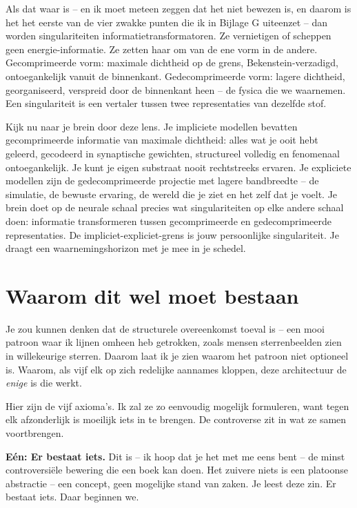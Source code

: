 \documentclass[11pt, twoside, openright]{book}
\begin{document}
Als dat waar is -- en ik moet meteen zeggen dat het niet bewezen is, en daarom is het het eerste van de vier zwakke punten die ik in Bijlage G uiteenzet -- dan worden singulariteiten informatietransformatoren. Ze vernietigen of scheppen geen energie-informatie. Ze zetten haar om van de ene vorm in de andere. Gecomprimeerde vorm: maximale dichtheid op de grens, Bekenstein-verzadigd, ontoegankelijk vanuit de binnenkant. Gedecomprimeerde vorm: lagere dichtheid, georganiseerd, verspreid door de binnenkant heen -- de fysica die we waarnemen. Een singulariteit is een vertaler tussen twee representaties van dezelfde stof.

Kijk nu naar je brein door deze lens. Je impliciete modellen bevatten gecomprimeerde informatie van maximale dichtheid: alles wat je ooit hebt geleerd, gecodeerd in synaptische gewichten, structureel volledig en fenomenaal ontoegankelijk. Je kunt je eigen substraat nooit rechtstreeks ervaren. Je expliciete modellen zijn de gedecomprimeerde projectie met lagere bandbreedte -- de simulatie, de bewuste ervaring, de wereld die je ziet en het zelf dat je voelt. Je brein doet op de neurale schaal precies wat singulariteiten op elke andere schaal doen: informatie transformeren tussen gecomprimeerde en gedecomprimeerde representaties. De impliciet-expliciet-grens is jouw persoonlijke singulariteit. Je draagt een waarnemingshorizon met je mee in je schedel.

\section*{Waarom dit wel moet bestaan}

Je zou kunnen denken dat de structurele overeenkomst toeval is -- een mooi patroon waar ik lijnen omheen heb getrokken, zoals mensen sterrenbeelden zien in willekeurige sterren. Daarom laat ik je zien waarom het patroon niet optioneel is. Waarom, als vijf elk op zich redelijke aannames kloppen, deze architectuur de \textit{enige} is die werkt.

Hier zijn de vijf axioma's. Ik zal ze zo eenvoudig mogelijk formuleren, want tegen elk afzonderlijk is moeilijk iets in te brengen. De controverse zit in wat ze samen voortbrengen.

\textbf{Eén: Er bestaat iets.} Dit is -- ik hoop dat je het met me eens bent -- de minst controversiële bewering die een boek kan doen. Het zuivere niets is een platoonse abstractie -- een concept, geen mogelijke stand van zaken. Je leest deze zin. Er bestaat iets. Daar beginnen we.
\end{document}
